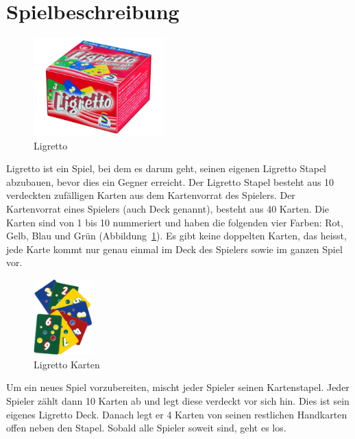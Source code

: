 \section{Spielbeschreibung}

\begin{figure}[hbt]
  \centering
  \includegraphics[width=0.45\textwidth,angle=0]{graphics/ligretto.jpg}
  \caption{Ligretto \hfill{} }
 \end{figure}

Ligretto ist ein Spiel, bei dem es darum geht, seinen eigenen Ligretto Stapel abzubauen, bevor dies ein Gegner erreicht. Der Ligretto Stapel besteht aus 10 verdeckten zufälligen Karten aus dem Kartenvorrat des Spielers. Der Kartenvorrat eines Spielers (auch Deck genannt), besteht aus 40 Karten. Die Karten sind von 1 bis 10 nummeriert und haben die folgenden vier Farben: Rot, Gelb, Blau und Grün (Abbildung~\ref{beschkarten}). Es gibt keine doppelten Karten, das heisst, jede Karte kommt nur genau einmal im Deck des Spielers sowie im ganzen Spiel vor.

\begin{figure}[hbt]
  \centering
  \includegraphics[width=0.20\textwidth,angle=0]{graphics/ligretto.png}
  \caption{Ligretto Karten \hfill{} }
  \label{beschkarten}
\end{figure}

Um ein neues Spiel vorzubereiten, mischt jeder Spieler seinen Kartenstapel. Jeder Spieler zählt dann 10 Karten ab und legt diese verdeckt vor sich hin. Dies ist sein eigenes Ligretto Deck. Danach legt er 4 Karten von seinen restlichen Handkarten offen neben den Stapel. Sobald alle Spieler soweit sind, geht es los.

\newpage

